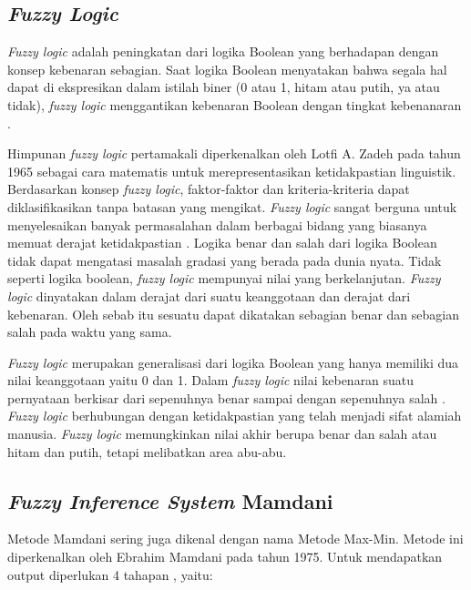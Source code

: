 \documentclass[a4paper]{article}
\begin{document}
\begin{multicols}{2}
\subsection{\textit{Fuzzy Logic}}

\par \textit{Fuzzy logic} adalah peningkatan dari logika Boolean yang berhadapan dengan konsep kebenaran sebagian. Saat logika Boolean menyatakan bahwa segala hal dapat di ekspresikan dalam istilah biner (0 atau 1, hitam atau putih, ya atau tidak), \textit{fuzzy logic} menggantikan kebenaran Boolean dengan tingkat kebenanaran \citep{Naba2009}.

\par Himpunan \textit{fuzzy logic} pertamakali diperkenalkan oleh Lotfi A. Zadeh pada tahun 1965 sebagai cara matematis untuk merepresentasikan ketidakpastian linguistik. Berdasarkan konsep \textit{fuzzy logic}, faktor-faktor dan kriteria-kriteria dapat diklasifikasikan tanpa batasan yang mengikat. \textit{Fuzzy logic} sangat berguna untuk menyelesaikan banyak permasalahan dalam berbagai bidang yang biasanya memuat derajat ketidakpastian \citep{Gokmen2010}. Logika benar dan salah dari logika Boolean tidak dapat mengatasi masalah gradasi yang berada pada dunia nyata. Tidak seperti logika boolean, \textit{fuzzy logic} mempunyai nilai yang berkelanjutan. \textit{Fuzzy logic} dinyatakan dalam derajat dari suatu keanggotaan dan derajat dari kebenaran. Oleh sebab itu sesuatu dapat dikatakan sebagian benar dan sebagian salah pada waktu yang sama. 

\par \textit{Fuzzy logic} merupakan generalisasi dari logika Boolean yang hanya memiliki dua nilai keanggotaan yaitu 0 dan 1. Dalam \textit{fuzzy logic} nilai kebenaran suatu pernyataan berkisar dari sepenuhnya benar sampai dengan sepenuhnya salah \citep{Meimaharani2014}. \textit{Fuzzy logic} berhubungan dengan ketidakpastian yang telah menjadi sifat alamiah manusia. \textit{Fuzzy logic} memungkinkan nilai akhir berupa benar dan salah atau hitam dan putih, tetapi melibatkan area abu-abu.

\subsection{\textit{Fuzzy Inference System} Mamdani}

\par Metode Mamdani sering juga dikenal dengan nama Metode Max-Min. Metode ini diperkenalkan oleh Ebrahim Mamdani pada tahun 1975. Untuk mendapatkan output diperlukan 4 tahapan \citep{Hermawan2014}, yaitu:


\end{multicols}
\end{document}
